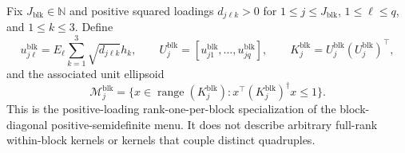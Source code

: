 Fix \(J_{\mathrm{blk}}\in\mathbb N\) and positive squared loadings \(d_{j\ell k}>0\) for \(1\le j\le J_{\mathrm{blk}}\), \(1\le\ell\le q\), and \(1\le k\le3\). Define
\[
u^{\mathrm{blk}}_{j\ell}
=E_\ell\sum_{k=1}^3\sqrt{d_{j\ell k}}h_k,
\qquad
U_j^{\mathrm{blk}}=[u^{\mathrm{blk}}_{j1},\ldots,u^{\mathrm{blk}}_{jq}],
\qquad
K_j^{\mathrm{blk}}=U_j^{\mathrm{blk}}(U_j^{\mathrm{blk}})^\top,
\]
and the associated unit ellipsoid
\[
\mathcal M_j^{\mathrm{blk}}
=\{x\in\operatorname{range}(K_j^{\mathrm{blk}}):
x^\top(K_j^{\mathrm{blk}})^\dagger x\le1\}.
\]
This is the positive-loading rank-one-per-block specialization of the block-diagonal positive-semidefinite menu.  It does not describe arbitrary full-rank within-block kernels or kernels that couple distinct quadruples.